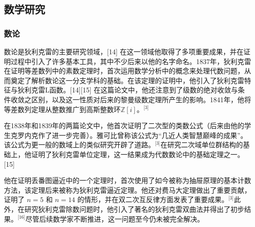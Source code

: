 \subsection{数学研究}
\subsubsection{数论}
数论是狄利克雷的主要研究领域，[14] 在这一领域他取得了多项重要成果，并在证明过程中引入了许多基本工具，其中不少后来以他的名字命名。1837年，狄利克雷在证明等差数列中的素数定理时，首次运用数学分析中的概念来处理代数问题，从而奠定了解析数论这一分支学科的基础。在该定理的证明中，他引入了狄利克雷特征与狄利克雷L函数。[14][15] 在这篇论文中，他还注意到了级数的绝对收敛与条件收敛之区别，以及这一性质对后来的黎曼级数定理所产生的影响。1841年，他将等差数列定理从整数推广到高斯整数环$\mathbb{Z}[i]$。\(^\text{[3]}\)

在1838年和1839年的两篇论文中，他首次证明了二次型的类数公式（后来由他的学生克罗内克作了进一步完善）。雅可比曾称该公式为“几近人类智慧巅峰的成果”。该公式为更一般的数域上的类似研究开辟了道路。\(^\text{[3]}\)在研究二次域单位群结构的基础上，他证明了狄利克雷单位定理，这一结果成为代数数论中的基础定理之一。[15]

他在证明丢番图逼近中的一个定理时，首次使用了如今被称为抽屉原理的基本计数方法，该定理后来被称为狄利克雷逼近定理。他还对费马大定理做出了重要贡献，证明了 $n=5$ 和 $n=14$ 的情形，并在双二次互反律方面发表了重要成果。\(^\text{[3]}\)此外，在研究狄利克雷除数问题时，他引入了著名的狄利克雷双曲法并得出了初步结果。\(^\text{[16]}\)尽管后续数学家不断推进，这一问题至今仍未被完全解决。
